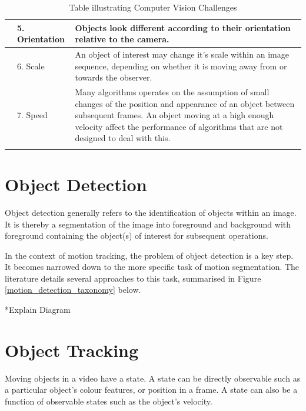 \begin{longtable}{| c  p{3cm}  p{5cm} |}
    &
    5. Orientation
    &
    Objects look different according to their orientation relative
    to the camera.
    \\ \bottomrule

    &
    6. Scale
    &
    An object of interest may change it's scale within an image
    sequence, depending on whether it is moving away from or towards
    the observer.
    \\ \bottomrule

    &
    7. Speed 
    &
    Many algorithms operates on the assumption of small
    changes of the position and appearance of an object between
    subsequent frames. An object moving at a high enough velocity
    affect the performance of algorithms that are not designed to
    deal with this.
    \\ \bottomrule
    \caption{Table illustrating Computer Vision Challenges}
    \label{table_computer_vision_challenges}
\end{longtable}

\section{Object Detection}
Object detection generally refers to the identification of objects within
an image. It is thereby a segmentation of the image into foreground
and background with foreground containing the object(s) of interest for subsequent
operations.

In the context of motion tracking, the problem of object detection is a key
step. It becomes narrowed down to the more specific task of motion segmentation.
The literature details several approaches to this task, summarised in 
Figure \ref{motion_detection_taxonomy} below.


*Explain Diagram

\section{Object Tracking}
Moving objects in a video have a state. A state can be directly observable such as a
particular object's colour features, or position in a frame. A state can also be a function
of observable states such as the object's velocity.

